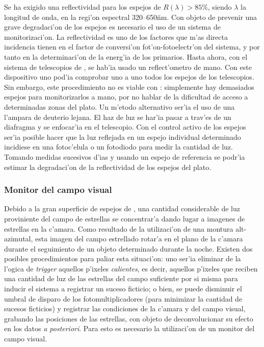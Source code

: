 Se ha exigido una reflectividad para los espejos de $R(\lambda)>85\%$, siendo
$\lambda$ la longitud de onda, en la regi'on espectral 320--650\u{nm}.  Con
objeto de prevenir una grave degradaci'on de los espejos es necesario
el uso de un sistema de monitorizaci'on.  La reflectividad es uno de
los factores que m'as directa incidencia tienen en el factor de
conversi'on fot'on-fotoelectr'on del sistema, y por tanto en la
determinaci'on de la energ'ia de los primarios.  Hasta ahora, con el
sistema de telescopios de \HEGRA, se hab'ia usado un reflect'ometro de
mano.  Con este dispositivo uno pod'ia comprobar uno a uno todos los
espejos de los telescopios. Sin embargo, este procedimiento no es
viable con \MAGIC: simplemente hay demasiados espejos para
monitorizarlos a mano, por no hablar de la dificultad de acceso a
determinadas zonas del plato.  Un m'etodo alternativo ser'ia el uso de
una l'ampara de deuterio lejana. El haz de luz se har'ia pasar a
trav'es de un diafragma y se enfocar'ia en el telescopio. Con el
control activo de los espejos ser'ia posible hacer que la luz
reflejada en un espejo individual determinado incidiese en una
fotoc'elula o un fotodiodo para medir la cantidad de luz.  Tomando
medidas sucesivos d'ias y usando un espejo de referencia se podr'ia
estimar la degradaci'on de la reflectividad de los espejos del plato.

\subsubsection{Monitor del campo visual}
%
Debido a la gran superficie de espejos de \MAGIC, una cantidad
considerable de luz proviniente del campo de estrellas se concentrar'a
dando lugar a imagenes de estrellas en la c'amara.  Como resultado de
la utilizaci'on de una montura alt-azimutal, esta imagen del campo
estrellado rotar'a en el plano de la c'amara durante el seguimiento de
un objeto determinado durante la noche.  Existen dos posibles
procedimientos para paliar esta situaci'on: uno ser'ia eliminar de la
l'ogica de \emph{trigger} aquellos p'ixeles \emph{calientes}, es
decir, aquellos p'ixeles que reciben una cantidad de luz de las
estrellas del campo suficiente por si misma para inducir el sistema a
registrar un suceso ficticio; o bien, se puede disminuir el umbral de
disparo de los fotomultiplicadores (para minimizar la cantidad de
sucesos ficticios) y registrar las condiciones de la c'amara y del
campo visual, grabando las posiciones de las estrellas, con objeto de
deconvolucionar su efecto en los datos \emph{a posteriori}.  Para esto
es necesario la utilizaci'on de un monitor del campo visual.

